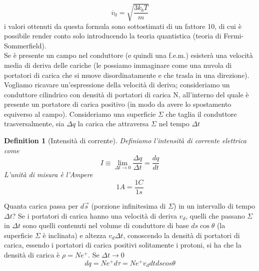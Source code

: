\documentclass[10pt,a4paper]{article}
\newtheorem{definition}{Definition}
\begin{document}
\[\overline{v}_0=\sqrt{\frac{3k_b T}{m}}\]
i valori ottenuti da questa formula sono sottostimati di un fattore 10, di cui è possibile render conto solo introducendo la teoria quantistica (teoria di Fermi-Sommerfield).\\
Se è presente un campo nel conduttore (e quindi una f.e.m.) esisterà una velocità media di deriva delle cariche (le possiamo immaginare come una nuvola di portatori di carica che si muove disordinatamente e che trasla in una direzione). Vogliamo ricavare un'espressione della velocità di deriva; consideriamo un conduttore cilindrico con densità di portatori di carica N, all'interno del quale è presente un portatore di carica positivo (in modo da avere lo spostamento equiverso al campo). Consideriamo una superficie \(\Sigma\) che taglia il conduttore trasversalmente, sia $\Delta q$ la carica che attraversa $\Sigma$ nel tempo $\Delta t$
\begin{definition}[Intensità di corrente]
	Definiamo l'intensità di corrente elettrica come
	\[I \equiv \lim_{\Delta t \to 0} \frac{\Delta q}{\Delta t}=\frac{dq}{dt}\]
	L'unità di misura è l'Ampere
	\[1 A = \frac{1 C}{1 s}\]
\end{definition}
Quanta carica passa per \(d\vec{s}\) (porzione infinitesima di $\Sigma$) in un intervallo di tempo $\Delta t$? Se i portatori di carica hanno una velocità di deriva \(v_d\), quelli che passano $\Sigma$ in $\Delta t$ sono quelli contenuti nel volume di conduttore di base \(ds\cos\theta\) (la superficie $\Sigma$ è inclinata) e altezza $v_d\Delta t$, conoscendo la densità di portatori di carica, essendo i portatori di carica positivi solitamente i protoni, si ha che la densità di carica è \(\rho = N e^+\). Se $\Delta t \to 0$
\[dq = N e^+ d\tau = N e^+ v_d dt ds cos\theta\]
\end{document}
